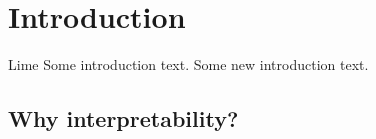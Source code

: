 \chapter{Introduction}
Lime \cite{ribeiro2016should}
Some introduction text.
Some new introduction text.

\section{Why interpretability?}


